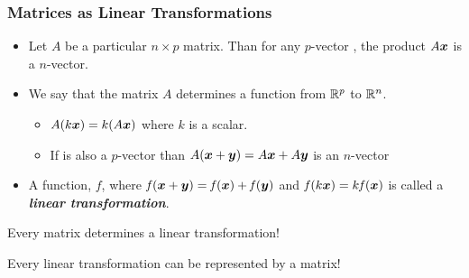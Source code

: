 \documentclass{beamer}
\begin{document}
\begin{frame}
  \frametitle{Matrices as Linear Transformations}

\begin{itemize}  

\item Let $A$ be a particular $n \times p$ matrix. Than for any $p$-vector , the product $A\bm{x}$ is a $n$-vector.

\item We say that the matrix $A$ determines a function from $\mathbb{R}^p$ to $\mathbb{R}^n$.  

\begin{itemize}
\item $A(k \bm{x}) = k(A \bm{x})$ where $k$ is a scalar.
\item If  is also a $p$-vector than $A(\bm{x}+\bm{y}) = A\bm{x} + A\bm{y}$ is  an $n$-vector
\end{itemize}


\item A function, $\mathit{f}$, where $\mathit{f}(\bm{x} + \bm{y}) = \mathit{f}(\bm{x}) + \mathit{f}(\bm{y})$ and $\mathit{f}(k\bm{x}) = k\mathit{f}(\bm{x})$ is called a \emph{\textbf{linear transformation}}.

\end{itemize}

\begin{Highlight}
Every matrix determines a linear transformation!

\medskip

Every linear transformation can be represented by a matrix!
\end{Highlight}

\end{frame}
\end{document}
